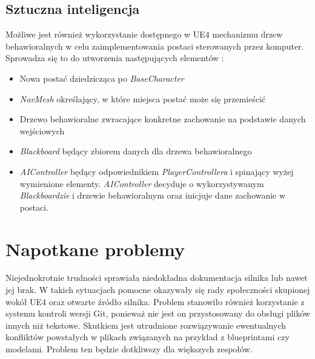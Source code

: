 \documentclass[multip]{SGGW-thesis}
\begin{document}
\section{Sztuczna inteligencja}
Możliwe jest również wykorzystanie dostępnego w UE4 mechanizmu drzew behawioralnych w celu zaimplementowania postaci sterowanych przez komputer. Sprowadza się to do utworzenia następujących elementów \cite{docs-behavior-tree-quick-start}:
\begin{itemize}
\item Nowa postać dziedzicząca po {\em BaseCharacter}
\item {\em NavMesh} określający, w które miejsca postać może się przemieścić
\item Drzewo behawioralne zwracające konkretne zachowanie na podstawie danych wejściowych
\item {\em Blackboard} będący zbiorem danych dla drzewa behawioralnego
\item {\em AIController} będący odpowiednikiem {\em PlayerControllera} i spinający wyżej wymienione elementy. {\em AIController} decyduje o wykorzystywanym {\em Blackboardzie} i drzewie behawioralnym oraz inicjuje dane zachowanie w postaci.
\end{itemize}

\chapter{Napotkane problemy}
Niejednokrotnie trudności sprawiała niedokładna dokumentacja silnika lub nawet jej brak. W takich sytuacjach pomocne okazywały się rady społeczności skupionej wokół UE4 oraz otwarte źródło silnika.
\newline \indent Problem stanowiło również korzystanie z systemu kontroli wersji Git, ponieważ nie jest on przystosowany do obsługi plików innych niż tekstowe. Skutkiem jest utrudnione rozwiązywanie ewentualnych konfliktów powstałych w plikach związanych na przykład z blueprintami czy modelami. Problem ten będzie dotkliwszy dla większych zespołów.
\end{document}
